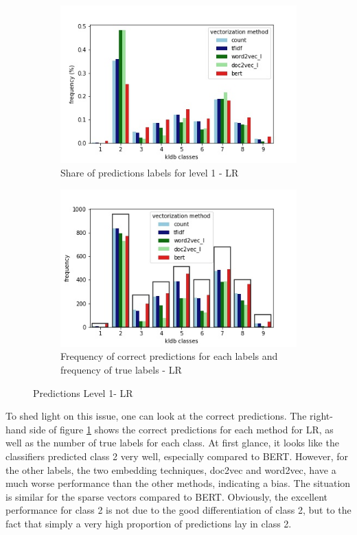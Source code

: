 \documentclass[12pt, a4paper, titlepage]{article}
\begin{document}
\begin{figure}[hb!]
  \centering
  \begin{subfigure}[b]{0.475\textwidth}
      \centering
      \includegraphics[width=\textwidth]{predictions_LR.jpg}
      { \bigskip
        {\small Share of predictions labels for level 1 - LR}
      }    
  \end{subfigure}
  \hfill
  \begin{subfigure}[b]{0.475\textwidth}  
      \centering 
      \includegraphics[width=\textwidth]{predictions_correct_relative_LR.jpg}
      {{\small Frequency of correct predictions for each labels and frequency of true labels - LR}}    
  \end{subfigure}
\caption{\label{fig: F13} Predictions Level 1- LR}
\end{figure}

To shed light on this issue, one can look at the correct predictions. The right-hand side of figure \ref{fig: F13} shows the correct predictions for each method for \ac{LR}, as well as the number of true labels for each class. At first glance, it looks like the classifiers predicted class 2 very well, especially compared to \ac{BERT}. However, for the other labels, the two embedding techniques, doc2vec and word2vec, have a much worse performance than the other methods, indicating a bias. The situation is similar for the sparse vectors compared to \ac{BERT}. Obviously, the excellent performance for class 2 is not due to the good differentiation of class 2, but to the fact that simply a very high proportion of predictions lay in class 2. 
\end{document}
